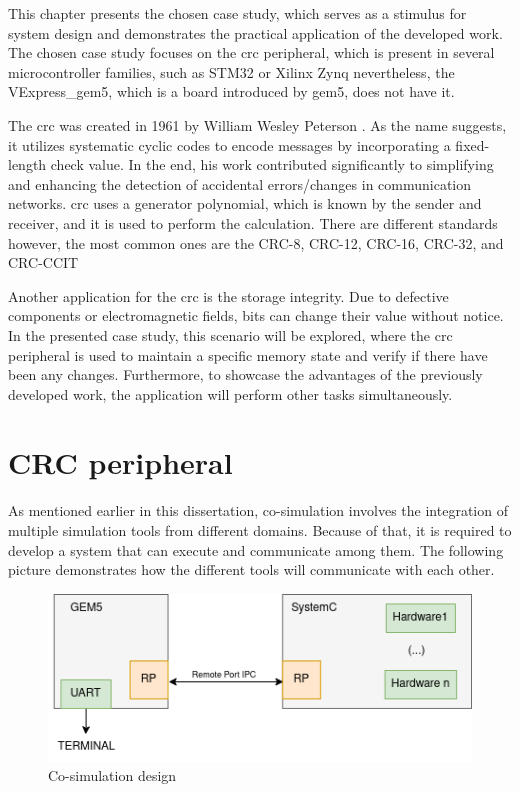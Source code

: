 
This chapter presents the chosen case study, which serves as a stimulus for system design and demonstrates 
the practical application of the developed work. The chosen case study focuses on the \gls{crc} peripheral,
which is present in several microcontroller families, such as STM32 \cite{referenceManualRM0385} or Xilinx Zynq \cite{xilinx2014zynq} 
nevertheless, the VExpress\_gem5, which is a board introduced by gem5, does not have it.

The \gls{crc} was created in 1961 by William Wesley Peterson \cite{peterson1961cyclic}. As the name suggests, 
it utilizes systematic cyclic codes to encode messages by incorporating a fixed-length check value. In the end, his work
contributed significantly to simplifying and enhancing the detection of accidental errors/changes in communication 
networks. \gls{crc} uses a generator polynomial, which is known by the sender and receiver, and it is used to 
perform the calculation. There are different standards however, the most common ones are the CRC-8, CRC-12, CRC-16, 
CRC-32, and CRC-CCIT \cite{borrelli2001ieee}

Another application for the \gls{crc} is the storage integrity. Due to defective components or electromagnetic fields,
bits can change their value without notice. In the presented case study, this scenario will be explored, where 
the \gls{crc} peripheral is used to maintain a specific memory state and verify if there have been any changes. 
Furthermore, to showcase the advantages of the previously developed work, the application will perform other 
tasks simultaneously. 

\section{CRC peripheral} %

As mentioned earlier in this dissertation, co-simulation involves the integration of multiple simulation tools from different
domains. Because of that, it is required to develop a system that can execute and communicate among them. The following picture
demonstrates how the different tools will communicate with each other.

\begin{figure}[H]
	\centering
 	\includegraphics[width=0.8\linewidth]{Images/CoSimDesignSimplified.png}
 	\caption{Co-simulation design}
	 \label{fig_CoSimDesignSimplified}
\end{figure}

